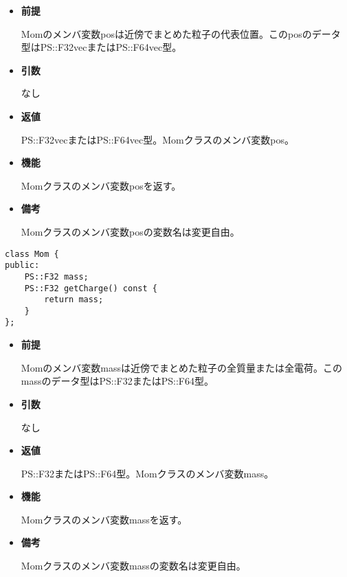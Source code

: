 \begin{itemize}

\item {\bf 前提}

  Momのメンバ変数posは近傍でまとめた粒子の代表位置。このposのデータ
  型はPS::F32vecまたはPS::F64vec型。
  
\item {\bf 引数}

  なし
  
\item {\bf 返値}

  PS::F32vecまたはPS::F64vec型。Momクラスのメンバ変数pos。

\item {\bf 機能}

  Momクラスのメンバ変数posを返す。
  
\item {\bf 備考}

  Momクラスのメンバ変数posの変数名は変更自由。

\end{itemize}


\begin{screen}
\begin{verbatim}
class Mom {
public:
    PS::F32 mass;
    PS::F32 getCharge() const {
        return mass;
    }
};
\end{verbatim}
\end{screen}

\begin{itemize}

\item {\bf 前提}

  Momのメンバ変数massは近傍でまとめた粒子の全質量または全電荷。この
  massのデータ型はPS::F32またはPS::F64型。

\item {\bf 引数}

  なし
  
\item {\bf 返値}

  PS::F32またはPS::F64型。Momクラスのメンバ変数mass。

\item {\bf 機能}

  Momクラスのメンバ変数massを返す。
  
\item {\bf 備考}

  Momクラスのメンバ変数massの変数名は変更自由。

\end{itemize}

